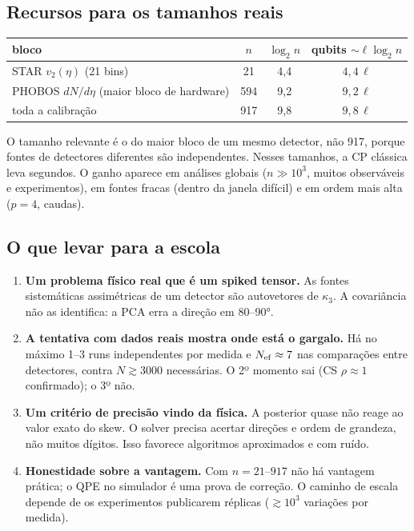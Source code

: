 \documentclass[11pt,a4paper]{article}
\begin{document}
\subsection{Recursos para os tamanhos reais}
\begin{center}\small
\begin{tabular}{@{}lccc@{}}
\toprule
bloco & $n$ & $\log_2 n$ & qubits $\sim\ell\log_2 n$ \\
\midrule
STAR $v_2(\eta)$ (21 bins) & 21 & 4,4 & $4{,}4\,\ell$ \\
PHOBOS $dN/d\eta$ (maior bloco de hardware) & 594 & 9,2 & $9{,}2\,\ell$ \\
toda a calibração & 917 & 9,8 & $9{,}8\,\ell$ \\
\bottomrule
\end{tabular}
\end{center}
O tamanho relevante é o do maior bloco de um mesmo detector, não 917, porque fontes de detectores diferentes são independentes.
Nesses tamanhos, a CP clássica leva segundos. O ganho aparece em análises globais ($n\gg10^3$, muitos observáveis e experimentos),
em fontes fracas (dentro da janela difícil) e em ordem mais alta ($p=4$, caudas).

\subsection{O que levar para a escola}
\begin{enumerate}[nosep]
\item \textbf{Um problema físico real que é um spiked tensor.} As fontes sistemáticas assimétricas de um detector são autovetores de $\kappa_3$.
A covariância não as identifica: a PCA erra a direção em 80--90°.
\item \textbf{A tentativa com dados reais mostra onde está o gargalo.} Há no máximo 1--3 runs independentes por medida e $N_{\rm ef}\approx7$
nas comparações entre detectores, contra $N\gtrsim3000$ necessárias. O 2º momento sai (CS $\rho\approx1$ confirmado); o 3º não.
\item \textbf{Um critério de precisão vindo da física.} A posterior quase não reage ao valor exato do skew. O solver precisa acertar direções e ordem
de grandeza, não muitos dígitos. Isso favorece algoritmos aproximados e com ruído.
\item \textbf{Honestidade sobre a vantagem.} Com $n=21$--$917$ não há vantagem prática; o QPE no simulador é uma prova de correção.
O caminho de escala depende de os experimentos publicarem réplicas ($\gtrsim10^3$ variações por medida).
\end{enumerate}
\end{document}

